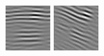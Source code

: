 \begin{figure}[ht]
\begin{center}
  \includegraphics[width=\columnwidth/9]{ch4/figures/real_1_4.jpg}
  \includegraphics[width=\columnwidth/9]{ch4/figures/real_1_5.jpg}

\end{center}
\end{figure}
